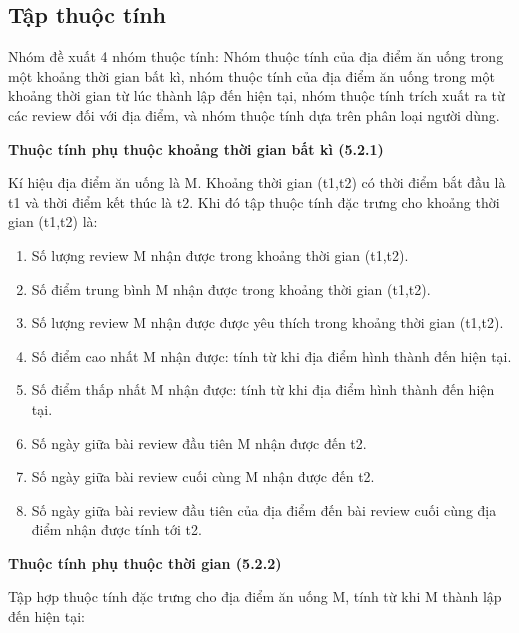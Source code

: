 \documentclass[12pt]{extarticle}
\begin{document}
		\subsection{Tập thuộc tính}
			\par Nhóm đề xuất 4 nhóm thuộc tính: Nhóm thuộc tính của địa điểm ăn uống trong một khoảng thời gian bất kì, nhóm thuộc tính của địa điểm ăn uống trong một khoảng thời gian từ lúc thành lập đến hiện tại, nhóm thuộc tính trích xuất ra từ các review đối với địa điểm, và nhóm thuộc tính dựa trên phân loại người dùng. 
			\par \textbf{Thuộc tính phụ thuộc khoảng thời gian bất kì (5.2.1)}
				\par Kí hiệu địa điểm ăn uống là M. Khoảng thời gian (t1,t2) có thời điểm bắt đầu là t1 và thời điểm kết thúc là t2. Khi đó tập thuộc tính đặc trưng cho khoảng thời gian (t1,t2) là:
				\begin{enumerate}
					\item Số lượng review M nhận được trong khoảng thời gian (t1,t2).
					\item Số điểm trung bình M nhận được trong khoảng thời gian (t1,t2).
					\item Số lượng review M nhận được được yêu thích trong khoảng thời gian (t1,t2).
					\item Số điểm cao nhất M nhận được: tính từ khi địa điểm hình thành đến hiện tại.	
					\item Số điểm thấp nhất M nhận được: tính từ khi địa điểm hình thành đến hiện tại.
					\item Số ngày giữa bài review đầu tiên M nhận được đến t2.
					\item Số ngày giữa bài review cuối cùng M nhận được đến t2.
					\item Số ngày giữa bài review đầu tiên của địa điểm đến bài review cuối cùng địa điểm nhận được tính tới t2.
				\end{enumerate}
			\par \textbf{Thuộc tính phụ thuộc thời gian (5.2.2)}
				\par Tập hợp thuộc tính đặc trưng cho địa điểm ăn uống M, tính từ khi M thành lập đến hiện tại:
\end{document}
